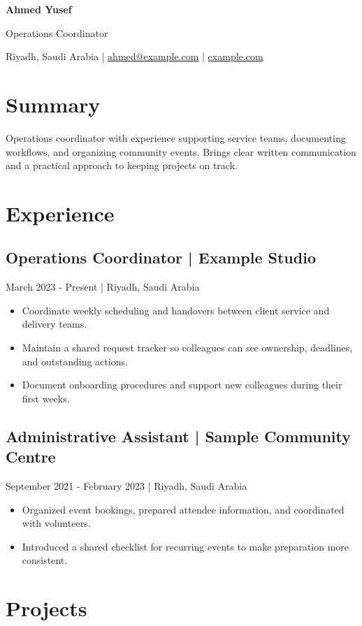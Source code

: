 \documentclass[a4paper,11pt]{article}
\begin{document}
{\Huge\bfseries Ahmed Yusef}\par
Operations Coordinator\par
Riyadh, Saudi Arabia | \href{mailto:ahmed@example.com}{ahmed@example.com} | \href{https://example.com}{example.com}\par
\section*{Summary}
Operations coordinator with experience supporting service teams, documenting workflows, and organizing community events. Brings clear written communication and a practical approach to keeping projects on track.\par
\section*{Experience}
\subsection*{Operations Coordinator | Example Studio}
March 2023 - Present | Riyadh, Saudi Arabia\par
\begin{itemize}
\item Coordinate weekly scheduling and handovers between client service and delivery teams.
\item Maintain a shared request tracker so colleagues can see ownership, deadlines, and outstanding actions.
\item Document onboarding procedures and support new colleagues during their first weeks.
\end{itemize}
\subsection*{Administrative Assistant | Sample Community Centre}
September 2021 - February 2023 | Riyadh, Saudi Arabia\par
\begin{itemize}
\item Organized event bookings, prepared attendee information, and coordinated with volunteers.
\item Introduced a shared checklist for recurring events to make preparation more consistent.
\end{itemize}
\section*{Projects}
\end{document}
